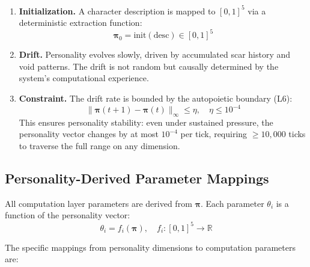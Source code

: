 \documentclass[11pt]{article}
\begin{document}
\begin{enumerate}[label=(\alph*),leftmargin=*]
\item \textbf{Initialization.} A character description is mapped to $[0,1]^5$ via a deterministic extraction function:
\begin{equation}
\boldsymbol{\pi}_0 = \text{init}(\text{desc}) \in [0,1]^5
\end{equation}

\item \textbf{Drift.} Personality evolves slowly, driven by accumulated scar history and void patterns. The drift is not random but causally determined by the system's computational experience.

\item \textbf{Constraint.} The drift rate is bounded by the autopoietic boundary (L6):
\begin{equation}
\|\boldsymbol{\pi}(t+1) - \boldsymbol{\pi}(t)\|_\infty \leq \eta, \quad \eta \leq 10^{-4}
\end{equation}
This ensures personality stability: even under sustained pressure, the personality vector changes by at most $10^{-4}$ per tick, requiring $\geq 10{,}000$ ticks to traverse the full range on any dimension.
\end{enumerate}

\subsection{Personality-Derived Parameter Mappings}
\label{sec:personality-param-mappings}

All computation layer parameters are derived from $\boldsymbol{\pi}$. Each parameter $\theta_i$ is a function of the personality vector:
\begin{equation}
\theta_i = f_i(\boldsymbol{\pi}), \quad f_i: [0,1]^5 \to \mathbb{R}
\end{equation}

The specific mappings from personality dimensions to computation parameters are:
\end{document}
